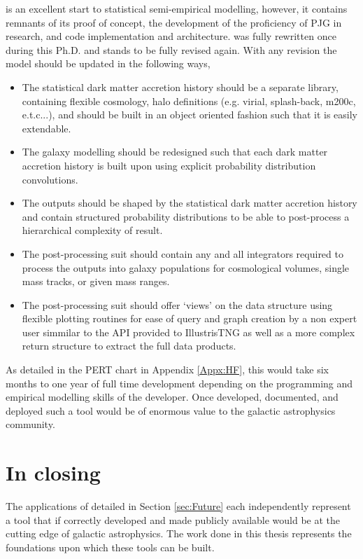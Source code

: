 \steel is an excellent start to statistical semi-empirical modelling, however, it contains remnants of its proof of concept, the development of the proficiency of PJG in research, and code implementation and architecture. \steel was fully rewritten once during this Ph.D. and stands to be fully revised again. With any revision the model should be updated in the following ways,

\begin{itemize}
    \item The statistical dark matter accretion history should be a separate library, containing flexible cosmology, halo definitions (e.g. virial, splash-back, m200c, e.t.c...), and should be built in an object oriented fashion such that it is easily extendable.
    \item The galaxy modelling should be redesigned such that each dark matter accretion history is built upon using explicit probability distribution convolutions.
    \item The outputs should be shaped by the statistical dark matter accretion history and contain structured probability distributions to be able to post-process a hierarchical complexity of result.
    \item The post-processing suit should contain any and all integrators required to process the outputs into galaxy populations for cosmological volumes, single mass tracks, or given mass ranges.
    \item The post-processing suit should offer `views' on the data structure using flexible plotting routines for ease of query and graph creation by a non expert user simmilar to the API provided to IllustrisTNG \cite[][https://www.tng-project.org/data/vis/]{Nelson2018TheRelease} as well as a more complex return structure to extract the full data products.
\end{itemize}

As detailed in the PERT chart in Appendix \ref{Appx:HF}, this would take six months to one year of full time development depending on the programming and empirical modelling skills of the developer. Once developed, documented, and deployed such a tool would be of enormous value to the galactic astrophysics community. 

\section{In closing}

The applications of \steel detailed in Section \ref{sec:Future} each independently represent a tool that if correctly developed and made publicly available would be at the cutting edge of galactic astrophysics. The work done in this thesis represents the foundations upon which these tools can be built. 

